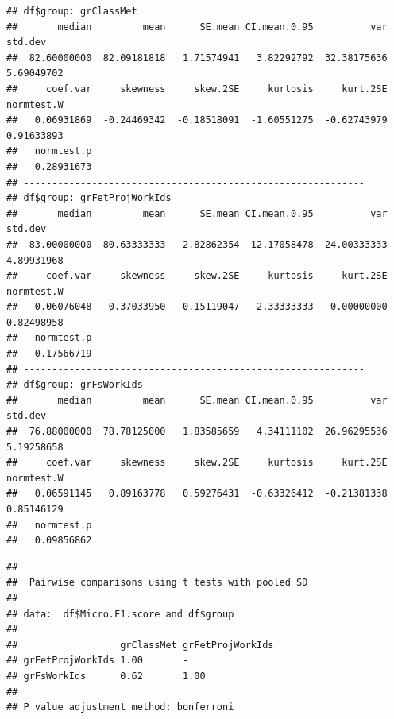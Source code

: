 \documentclass[
]{article}
\newenvironment{Shaded}{\begin{snugshade}}{\end{snugshade}}
\newcommand{\AttributeTok}[1]{\textcolor[rgb]{0.77,0.63,0.00}{#1}}
\newcommand{\ConstantTok}[1]{\textcolor[rgb]{0.00,0.00,0.00}{#1}}
\newcommand{\FunctionTok}[1]{\textcolor[rgb]{0.00,0.00,0.00}{#1}}
\newcommand{\NormalTok}[1]{#1}
\newcommand{\OtherTok}[1]{\textcolor[rgb]{0.56,0.35,0.01}{#1}}
\newcommand{\SpecialCharTok}[1]{\textcolor[rgb]{0.00,0.00,0.00}{#1}}
\newcommand{\StringTok}[1]{\textcolor[rgb]{0.31,0.60,0.02}{#1}}
\begin{document}
\begin{Shaded}
\end{Shaded}

\begin{verbatim}
## df$group: grClassMet
##       median         mean      SE.mean CI.mean.0.95          var      std.dev 
##  82.60000000  82.09181818   1.71574941   3.82292792  32.38175636   5.69049702 
##     coef.var     skewness     skew.2SE     kurtosis     kurt.2SE   normtest.W 
##   0.06931869  -0.24469342  -0.18518091  -1.60551275  -0.62743979   0.91633893 
##   normtest.p 
##   0.28931673 
## ------------------------------------------------------------ 
## df$group: grFetProjWorkIds
##       median         mean      SE.mean CI.mean.0.95          var      std.dev 
##  83.00000000  80.63333333   2.82862354  12.17058478  24.00333333   4.89931968 
##     coef.var     skewness     skew.2SE     kurtosis     kurt.2SE   normtest.W 
##   0.06076048  -0.37033950  -0.15119047  -2.33333333   0.00000000   0.82498958 
##   normtest.p 
##   0.17566719 
## ------------------------------------------------------------ 
## df$group: grFsWorkIds
##       median         mean      SE.mean CI.mean.0.95          var      std.dev 
##  76.88000000  78.78125000   1.83585659   4.34111102  26.96295536   5.19258658 
##     coef.var     skewness     skew.2SE     kurtosis     kurt.2SE   normtest.W 
##   0.06591145   0.89163778   0.59276431  -0.63326412  -0.21381338   0.85146129 
##   normtest.p 
##   0.09856862
\end{verbatim}

\begin{Shaded}
\end{Shaded}

\begin{verbatim}
## 
##  Pairwise comparisons using t tests with pooled SD 
## 
## data:  df$Micro.F1.score and df$group 
## 
##                  grClassMet grFetProjWorkIds
## grFetProjWorkIds 1.00       -               
## grFsWorkIds      0.62       1.00            
## 
## P value adjustment method: bonferroni
\end{verbatim}
\end{document}
